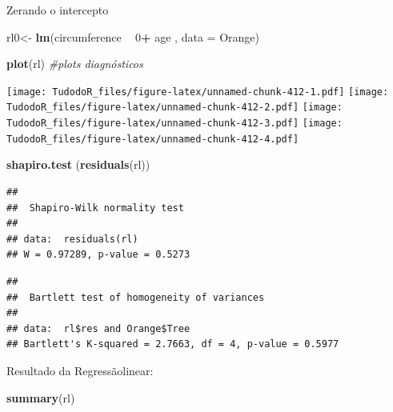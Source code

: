 \documentclass[
]{book}
\newenvironment{Shaded}{\begin{snugshade}}{\end{snugshade}}
\newcommand{\CommentTok}[1]{\textcolor[rgb]{0.56,0.35,0.01}{\textit{#1}}}
\newcommand{\DataTypeTok}[1]{\textcolor[rgb]{0.13,0.29,0.53}{#1}}
\newcommand{\DecValTok}[1]{\textcolor[rgb]{0.00,0.00,0.81}{#1}}
\newcommand{\KeywordTok}[1]{\textcolor[rgb]{0.13,0.29,0.53}{\textbf{#1}}}
\newcommand{\NormalTok}[1]{#1}
\newcommand{\OperatorTok}[1]{\textcolor[rgb]{0.81,0.36,0.00}{\textbf{#1}}}
\newcommand{\StringTok}[1]{\textcolor[rgb]{0.31,0.60,0.02}{#1}}
\begin{document}
Zerando o intercepto

\begin{Shaded}
\begin{Highlighting}[]
\NormalTok{rl0<-}\StringTok{ }\KeywordTok{lm}\NormalTok{(circumference }\OperatorTok{~}\StringTok{ }\DecValTok{0}\OperatorTok{+}\StringTok{ }\NormalTok{age , }\DataTypeTok{data =}\NormalTok{ Orange)}
\end{Highlighting}
\end{Shaded}

\begin{Shaded}
\begin{Highlighting}[]
\KeywordTok{plot}\NormalTok{(rl) }\CommentTok{#plots diagnósticos}
\end{Highlighting}
\end{Shaded}

\texttt{[image: TudodoR\_files/figure-latex/unnamed-chunk-412-1.pdf]} \texttt{[image: TudodoR\_files/figure-latex/unnamed-chunk-412-2.pdf]} \texttt{[image: TudodoR\_files/figure-latex/unnamed-chunk-412-3.pdf]} \texttt{[image: TudodoR\_files/figure-latex/unnamed-chunk-412-4.pdf]}

\begin{Shaded}
\begin{Highlighting}[]
\KeywordTok{shapiro.test}\NormalTok{ (}\KeywordTok{residuals}\NormalTok{(rl))}
\end{Highlighting}
\end{Shaded}

\begin{verbatim}
## 
##  Shapiro-Wilk normality test
## 
## data:  residuals(rl)
## W = 0.97289, p-value = 0.5273
\end{verbatim}

\begin{Shaded}
\end{Shaded}

\begin{verbatim}
## 
##  Bartlett test of homogeneity of variances
## 
## data:  rl$res and Orange$Tree
## Bartlett's K-squared = 2.7663, df = 4, p-value = 0.5977
\end{verbatim}

Resultado da Regressãolinear:

\begin{Shaded}
\begin{Highlighting}[]
\KeywordTok{summary}\NormalTok{(rl)}
\end{Highlighting}
\end{Shaded}
\end{document}
